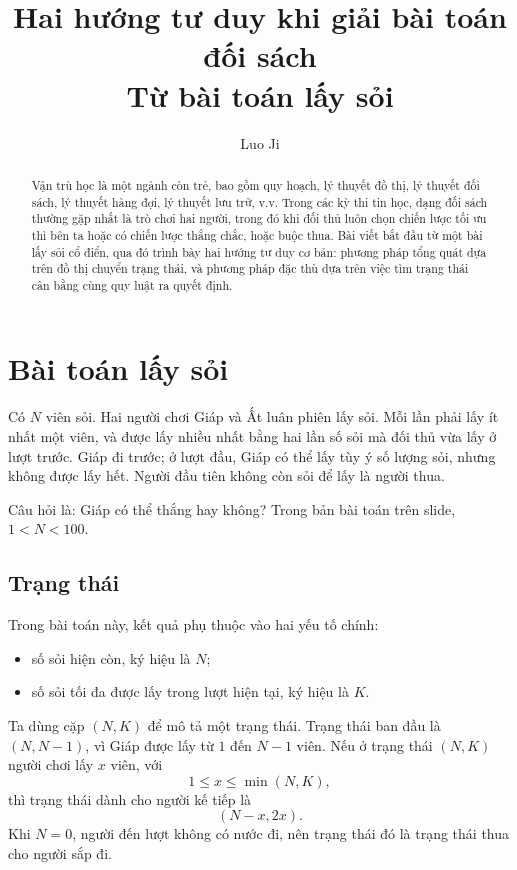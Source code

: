 \documentclass[11pt]{article}
\title{Hai hướng tư duy khi giải bài toán đối sách\\
\large Từ bài toán lấy sỏi}
\author{Luo Ji}
\date{}
\begin{document}
\maketitle


\begin{abstract}
Vận trù học là một ngành còn trẻ, bao gồm quy hoạch, lý thuyết đồ thị,
lý thuyết đối sách, lý thuyết hàng đợi, lý thuyết lưu trữ, v.v. Trong các
kỳ thi tin học, dạng đối sách thường gặp nhất là trò chơi hai người, trong đó
khi đối thủ luôn chọn chiến lược tối ưu thì bên ta hoặc có chiến lược thắng
chắc, hoặc buộc thua. Bài viết bắt đầu từ một bài lấy sỏi cổ điển, qua đó
trình bày hai hướng tư duy cơ bản: phương pháp tổng quát dựa trên đồ thị
chuyển trạng thái, và phương pháp đặc thù dựa trên việc tìm trạng thái cân
bằng cùng quy luật ra quyết định.
\end{abstract}

\tableofcontents

\section{Bài toán lấy sỏi}

Có \(N\) viên sỏi. Hai người chơi Giáp và Ất luân phiên lấy sỏi. Mỗi lần phải
lấy ít nhất một viên, và được lấy nhiều nhất bằng hai lần số sỏi mà đối thủ
vừa lấy ở lượt trước. Giáp đi trước; ở lượt đầu, Giáp có thể lấy tùy ý số
lượng sỏi, nhưng không được lấy hết. Người đầu tiên không còn sỏi để lấy là
người thua.

Câu hỏi là: Giáp có thể thắng hay không? Trong bản bài toán trên slide,
\(1<N<100\).

\subsection{Trạng thái}

Trong bài toán này, kết quả phụ thuộc vào hai yếu tố chính:
\begin{itemize}
  \item số sỏi hiện còn, ký hiệu là \(N\);
  \item số sỏi tối đa được lấy trong lượt hiện tại, ký hiệu là \(K\).
\end{itemize}

Ta dùng cặp \((N,K)\) để mô tả một trạng thái. Trạng thái ban đầu là
\((N,N-1)\), vì Giáp được lấy từ \(1\) đến \(N-1\) viên. Nếu ở trạng thái
\((N,K)\) người chơi lấy \(x\) viên, với
\[
  1\le x\le \min(N,K),
\]
thì trạng thái dành cho người kế tiếp là
\[
  (N-x,2x).
\]
Khi \(N=0\), người đến lượt không có nước đi, nên trạng thái đó là trạng thái
thua cho người sắp đi.
\end{document}
